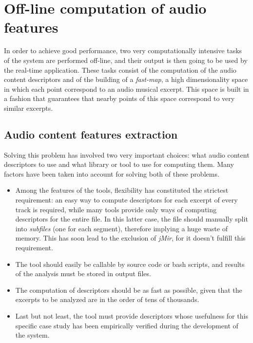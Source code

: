 \chapter{Off-line computation of audio features} %

\label{Chapter5} %

In order to achieve good performance, two very computationally intensive tasks of the system are performed off-line, and their output is then going to be used by the real-time application. These tasks consist of the computation of the audio content descriptors and of the building of a \textit{fast-map}, a high dimensionality space in which each point correspond to an audio musical excerpt. This space is built in a fashion that guarantees that nearby points of this space correspond to very similar excerpts.


\section{Audio content features extraction}
Solving this problem has involved two very important choices: what audio content descriptors to use and what library or tool to use for computing them. Many factors have been taken into account for solving both of these problems.\\ 
\begin{itemize}
\item Among the features of the tools, flexibility has constituted the strictest requirement: an easy way to compute descriptors for each excerpt of every track is required, while many tools provide only ways of computing descriptors for the entire file. In this latter case, the file should manually split into \textit{subfiles} (one for each segment), therefore implying a huge waste of memory. This has soon lead to the exclusion of \textit{jMir}, for it doesn't fulfill this requirement.
\item The tool should easily be callable by source code or bash scripts, and results of the analysis must be stored in output files.
\item The computation of descriptors should be as fast as possible, given that the excerpts to be analyzed are in the order of tens of thousands.
\item Last but not least, the tool must provide descriptors whose usefulness for this specific case study has been empirically verified during the development of the system.
\end{itemize}

